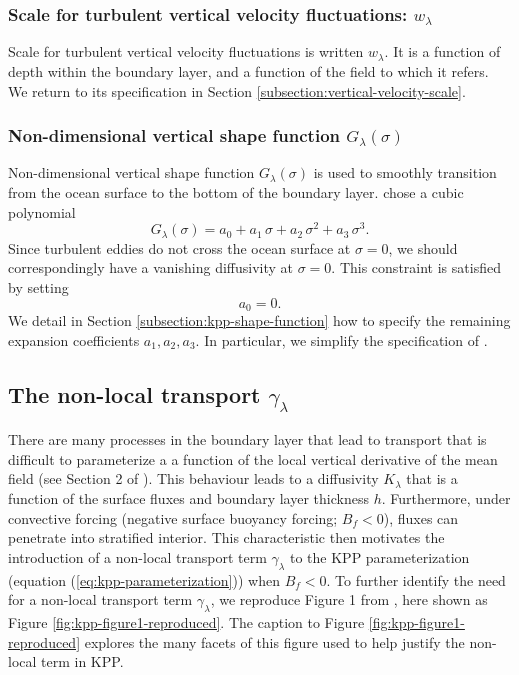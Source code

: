 \subsubsection{Scale for turbulent vertical velocity fluctuations: $w_{\lambda}$}
\label{subsubsection:turbulent-vertical-velocity-scale}

Scale for turbulent vertical velocity fluctuations is written
$w_{\lambda}$.  It is a function of depth within the boundary layer,
and a function of the field to which it refers. We return to its
specification in Section \ref{subsection:vertical-velocity-scale}.


\subsubsection{Non-dimensional vertical shape function $G_{\lambda}(\sigma)$}

Non-dimensional vertical shape function $G_{\lambda}(\sigma)$ is used to
smoothly transition from the ocean surface to the bottom of the
boundary layer. \cite{LargeKPP} chose a cubic polynomial
\begin{equation}
 G_{\lambda}(\sigma) = a_{0} + a_{1} \, \sigma + a_{2} \, \sigma^{2} + a_{3} \, \sigma^{3}.
\label{eq:structure-function-gsigma}
\end{equation}
Since turbulent eddies do not cross the ocean surface at $\sigma=0$,
we should correspondingly have a vanishing diffusivity at $\sigma=0$.
This constraint is satisfied by setting 
\begin{equation}
 a_{0} = 0.
\end{equation}
We detail in Section \ref{subsection:kpp-shape-function} how to
specify the remaining expansion coefficients $a_{1}, a_{2}, a_{3}$.
In particular, we simplify the specification of \cite{LargeKPP}.


\subsection{The non-local transport $\gamma_{\lambda}$}
\label{subsection:kpp-nonlocal-transport-outline}

There are many processes in the boundary layer that lead to transport
that is difficult to parameterize a a function of the local vertical
derivative of the mean field (see Section 2 of \cite{LargeKPP}).  This
behaviour leads to a diffusivity $K_{\lambda}$ that is a function of
the surface fluxes and boundary layer thickness $h$.  Furthermore,
under convective forcing (negative surface buoyancy forcing; $B_{f} <
0$), fluxes can penetrate into stratified interior.  This
characteristic then motivates the introduction of a non-local
transport term $\gamma_{\lambda}$ to the KPP parameterization
(equation (\ref{eq:kpp-parameterization})) when $B_{f} < 0$.  To
further identify the need for a non-local transport term
$\gamma_{\lambda}$, we reproduce Figure 1 from \cite{LargeKPP}, here
shown as Figure \ref{fig:kpp-figure1-reproduced}.  The caption to
Figure \ref{fig:kpp-figure1-reproduced} explores the many facets of
this figure used to help justify the non-local term in KPP.

